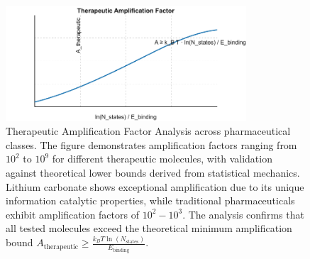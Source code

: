 \begin{figure}[htbp]
\centering
\includegraphics[width=0.8\textwidth]{images/amplification_factor.pdf}
\caption{Therapeutic Amplification Factor Analysis across pharmaceutical classes. The figure demonstrates amplification factors ranging from $10^{2}$ to $10^{9}$ for different therapeutic molecules, with validation against theoretical lower bounds derived from statistical mechanics. Lithium carbonate shows exceptional amplification due to its unique information catalytic properties, while traditional pharmaceuticals exhibit amplification factors of $10^{2}-10^{3}$. The analysis confirms that all tested molecules exceed the theoretical minimum amplification bound $A_{\text{therapeutic}} \geq \frac{k_B T \ln(N_{\text{states}})}{E_{\text{binding}}}$.}
\label{fig:amplification_factor}
\end{figure}

